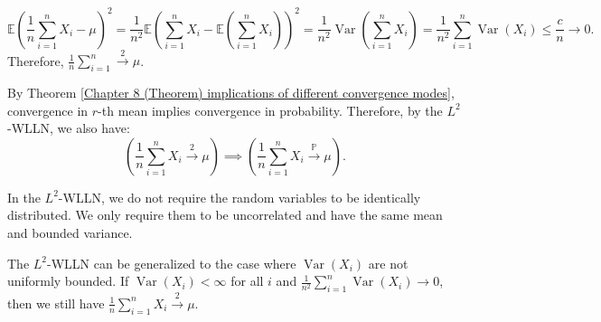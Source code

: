 \documentclass{huhtakm-template-book-v2}
\newcommand{\prob}{\mathbb{P}}
\newcommand{\expect}{\mathbb{E}}
\DeclareMathOperator{\Var}{Var}
\begin{document}
    \begin{proofing}
        \begin{equation*}
            \expect\left(\frac{1}{n}\sum_{i = 1}^{n}X_{i}-\mu\right)^{2} = \frac{1}{n^{2}}\expect\left(\sum_{i = 1}^{n}X_{i}-\expect\left(\sum_{i = 1}^{n}X_{i}\right)\right)^{2} = \frac{1}{n^{2}}\Var\left(\sum_{i = 1}^{n}X_{i}\right) = \frac{1}{n^{2}}\sum_{i = 1}^{n}\Var(X_{i}) \leq \frac{c}{n} \to 0.
        \end{equation*}
        Therefore, $\frac{1}{n}\sum_{i = 1}^{n} \xrightarrow{2} \mu$.
    \end{proofing}
    \begin{rem}
        By Theorem \ref{Chapter 8 (Theorem) implications of different convergence modes}, convergence in $r$-th mean implies convergence in probability. Therefore, by the $L^{2}$-WLLN, we also have:
        \begin{equation*}
            \left(\frac{1}{n}\sum_{i = 1}^{n}X_{i} \xrightarrow{2} \mu\right) \implies \left(\frac{1}{n}\sum_{i = 1}^{n}X_{i} \xrightarrow{\prob} \mu\right).
        \end{equation*}
    \end{rem}
    \begin{rem}
        In the $L^{2}$-WLLN, we do not require the random variables to be identically distributed. We only require them to be uncorrelated and have the same mean and bounded variance.
    \end{rem}
    \begin{rem}
        The $L^{2}$-WLLN can be generalized to the case where $\Var(X_{i})$ are not uniformly bounded. If $\Var(X_{i}) < \infty$ for all $i$ and $\frac{1}{n^{2}}\sum_{i = 1}^{n}\Var(X_{i}) \to 0$, then we still have $\frac{1}{n}\sum_{i = 1}^{n}X_{i} \xrightarrow{2} \mu$.
    \end{rem}
    \newpage
\end{document}
